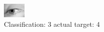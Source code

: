 \begin{figure}[h!]
\begin{center}
\includegraphics[width=0.60\columnwidth]{figures/ID2898_class_3_target_4.png}
\end{center}
\caption{ Classification: 3 actual target: 4}
\label{fig:ID2898_class_3_target_4}
\end{figure}
